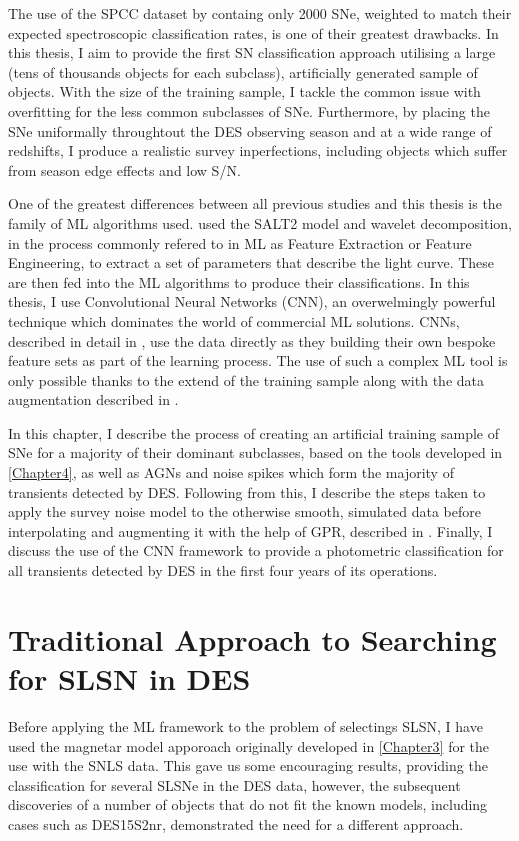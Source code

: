 The use of the SPCC dataset by \citet{Lochner2016} containg only 2000 SNe, weighted to match their expected spectroscopic classification rates, is one of their greatest drawbacks. In this thesis, I aim to provide the first SN classification approach utilising a large (tens of thousands objects for each subclass), artificially generated sample of objects. With the size of the training sample, I tackle the common issue with overfitting for the less common subclasses of SNe. Furthermore, by placing the SNe uniformally throughtout the DES observing season and at a wide range of redshifts, I produce a realistic survey inperfections, including objects which suffer from season edge effects and low S/N.

One of the greatest differences between all previous studies and this thesis is the family of ML algorithms used. \citet{Lochner2016} used the SALT2 model and wavelet decomposition, in the process commonly refered to in ML as Feature Extraction or Feature Engineering, to extract a set of parameters that describe the light curve. These are then fed into the ML algorithms to produce their classifications. In this thesis, I use Convolutional Neural Networks (CNN), an overwelmingly powerful technique which dominates the world of commercial ML solutions. CNNs, described in detail in , use the data directly as they building their own bespoke feature sets as part of the learning process. The use of such a complex ML tool is only possible thanks to the extend of the training sample along with the data augmentation described in .

In this chapter, I describe the process of creating an artificial training sample of SNe for a majority of their dominant subclasses, based on the tools developed in \cref{Chapter4}, as well as AGNs and noise spikes which form the majority of transients detected by DES. Following from this, I describe the steps taken to apply the survey noise model to the otherwise smooth, simulated data before interpolating and augmenting it with the help of GPR, described in . Finally, I discuss the use of the CNN framework to provide a photometric classification for all transients detected by DES in the first four years of its operations.

\section{Traditional Approach to Searching for SLSN in DES}
Before applying the ML framework to the problem of selectings SLSN, I have used the magnetar model apporoach originally developed in \cref{Chapter3} for the use with the SNLS data. This gave us some encouraging results, providing the classification for several SLSNe in the DES data, however, the subsequent discoveries of a number of objects that do not fit the known models, including cases such as DES15S2nr, demonstrated the need for a different approach.

